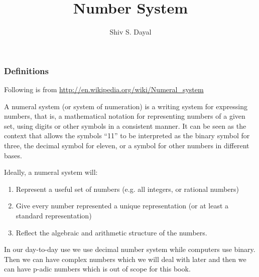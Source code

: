 \documentclass[aspectratio=1610]{beamer}
\begin{document}
\begin{frame}
\title{Number System}
\author{Shiv S. Dayal}
\titlepage
\end{frame}

\begin{frame}
\frametitle{Definitions}
Following is from \url{http://en.wikipedia.org/wiki/Numeral\_system}

A numeral system (or system of numeration) is a writing system for expressing 
numbers, that is, a mathematical notation for representing numbers of a given 
set, using digits or other symbols in a consistent manner. It can be seen as the 
context that allows the symbols ``11'' to be interpreted as the binary symbol 
for three, the decimal symbol for eleven, or a symbol for other numbers in 
different bases.

Ideally, a numeral system will:
\begin{enumerate}
\item Represent a useful set of numbers (e.g. all integers, or rational numbers)
\item Give every number represented a unique representation (or at least a 
standard representation)
\item Reflect the algebraic and arithmetic structure of the numbers.
\end{enumerate}

In our day-to-day use we use decimal number system while computers use binary. 
Then we can have complex numbers which we will deal with later and then we can 
have p-adic numbers which is out of scope for this book.
\end{frame}
\end{document}

